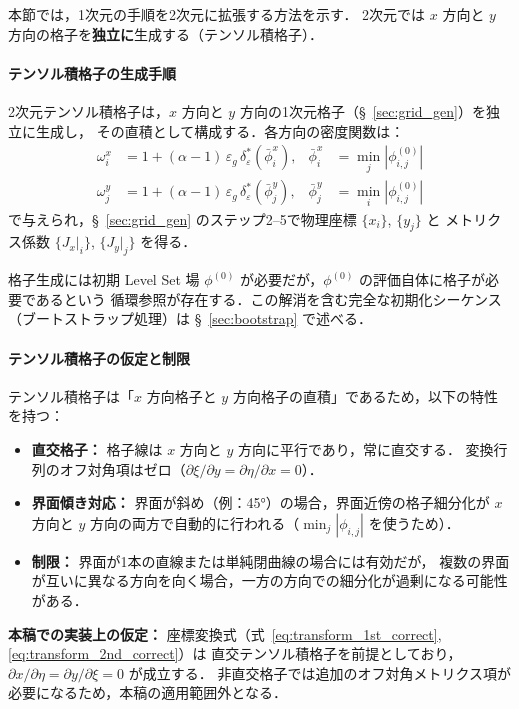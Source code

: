 本節では，1次元の手順を2次元に拡張する方法を示す．
2次元では $x$ 方向と $y$ 方向の格子を\textbf{独立に}生成する（テンソル積格子）．

\paragraph{テンソル積格子の生成手順}

2次元テンソル積格子は，$x$ 方向と $y$ 方向の1次元格子（§~\ref{sec:grid_gen}）を独立に生成し，
その直積として構成する．各方向の密度関数は：
\begin{align*}
  \omega^x_i &= 1 + (\alpha-1)\,\varepsilon_g\,\delta_\varepsilon^*(\bar{\phi}^x_i), &
  \bar{\phi}^x_i &= \min_j |\phi^{(0)}_{i,j}| \\
  \omega^y_j &= 1 + (\alpha-1)\,\varepsilon_g\,\delta_\varepsilon^*(\bar{\phi}^y_j), &
  \bar{\phi}^y_j &= \min_i |\phi^{(0)}_{i,j}|
\end{align*}
で与えられ，§~\ref{sec:grid_gen} のステップ2--5で物理座標 $\{x_i\}$, $\{y_j\}$ と
メトリクス係数 $\{J_x|_i\}$, $\{J_y|_j\}$ を得る．

格子生成には初期 Level Set 場 $\phi^{(0)}$ が必要だが，$\phi^{(0)}$ の評価自体に格子が必要であるという
循環参照が存在する．この解消を含む完全な初期化シーケンス（ブートストラップ処理）は
§~\ref{sec:bootstrap} で述べる．

\paragraph{テンソル積格子の仮定と制限}
テンソル積格子は「$x$ 方向格子と $y$ 方向格子の直積」であるため，以下の特性を持つ：
\begin{itemize}
  \item \textbf{直交格子：} 格子線は $x$ 方向と $y$ 方向に平行であり，常に直交する．
        変換行列のオフ対角項はゼロ（$\partial\xi/\partial y = \partial\eta/\partial x = 0$）．
  \item \textbf{界面傾き対応：} 界面が斜め（例：45°）の場合，界面近傍の格子細分化が
        $x$ 方向と $y$ 方向の両方で自動的に行われる（$\min_j|\phi_{i,j}|$ を使うため）．
  \item \textbf{制限：} 界面が1本の直線または単純閉曲線の場合には有効だが，
        複数の界面が互いに異なる方向を向く場合，一方の方向での細分化が過剰になる可能性がある．
\end{itemize}

\textbf{本稿での実装上の仮定：} 座標変換式（式~\eqref{eq:transform_1st_correct}, \eqref{eq:transform_2nd_correct}）は
直交テンソル積格子を前提としており，$\partial x/\partial\eta = \partial y/\partial\xi = 0$ が成立する．
非直交格子では追加のオフ対角メトリクス項が必要になるため，本稿の適用範囲外となる．

